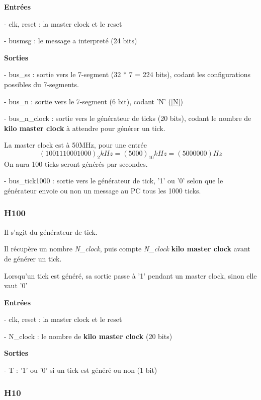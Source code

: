 \documentclass[10pt]{article}
\begin{document}
        \textbf{Entrées}
        
            - clk, reset : la master clock et le reset
            
            - busmsg : le message a interpreté (24 bits)
                            
        \textbf{Sorties}
            
            - bus\_ss : sortie vers le 7-segment (32 * 7 = 224 bits), codant les configurations possibles du 7-segments.
           
            - bus\_n : sortie vers le 7-segment (6 bit), codant 'N' (\ref{N})

            - bus\_n\_clock : sortie vers le générateur de ticks (20 bits), codant le nombre de \textbf{kilo master clock} à attendre pour générer un tick.
            
            La master clock est à 50MHz, pour une entrée
            $$(1001110001000)_2 kHz = (5000)_{10} kHz = (5000000) Hz$$
            On aura 100 ticks seront générés par secondes.
            
            - bus\_tick1000 : sortie vers le générateur de tick, '1' ou '0' selon que le générateur envoie ou non un message au PC tous les 1000 ticks.

        
        \subsubsection{H100}
        
        Il s'agit du générateur de tick.
                
        Il récupère un nombre \textit{N\_clock}, puis compte \textit{N\_clock} \textbf{kilo master clock}
        avant de générer un tick.
        
        Lorsqu'un tick est généré, sa sortie passe à '1' pendant un master clock, sinon elle vaut '0'
        
        \textbf{Entrées}
        
            - clk, reset : la master clock et le reset
            
            - N\_clock : le nombre de \textbf{kilo master clock} (20 bits)
                            
        \textbf{Sorties}
            
            - T : '1' ou '0' si un tick est généré ou non (1 bit)
        
        \subsubsection{H10}
        
\end{document}
